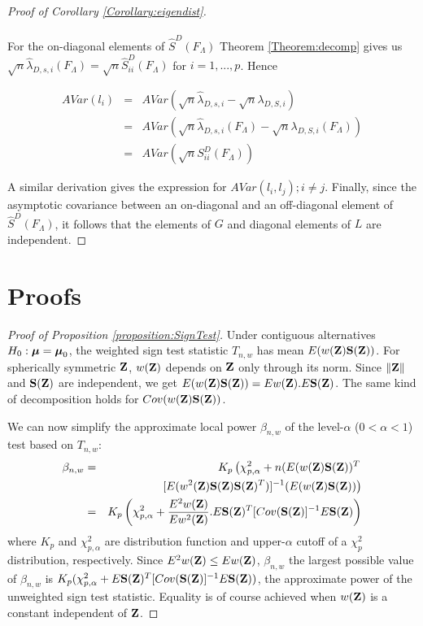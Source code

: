 \documentclass[fleqn,11pt]{article}
\begin{document}
\begin{proof}[Proof of Corollary \ref{Corollary:eigendist}]
\paragraph{}For the on-diagonal elements of $\hat S^D(F_\Lambda)$ Theorem \ref{Theorem:decomp} gives us $ \sqrt n \hat\lambda_{D,s,i} (F_\Lambda) = \sqrt n \hat S^D_{ii}(F_\Lambda)$ for $i = 1,...,p$. Hence

\begin{eqnarray*}
AVar(l_i) &=& AVar(\sqrt n \hat\lambda_{D,s,i} - \sqrt n \lambda_{D,S,i})\\
&=& AVar(\sqrt n \hat\lambda_{D,s,i} (F_\Lambda) - \sqrt n \lambda_{D,S,i}(F_\Lambda))\\
&=& AVar(\sqrt n S^D_{ii}(F_\Lambda))
\end{eqnarray*}

A similar derivation gives the expression for $AVar(l_i,l_j); i \neq j$. Finally, since the asymptotic covariance between an on-diagonal and an off-diagonal element of $\hat S^D(F_\Lambda)$, it follows that the elements of $G$ and diagonal elements of $L$ are independent.
\end{proof}

\section{Proofs}\label{section:appC}

\begin{proof}[Proof of Proposition \ref{proposition:SignTest}]
Under contiguous alternatives $H_0: {\boldsymbol{\mu}} = {\boldsymbol{\mu}}_0$, the weighted sign test statistic $T_{n,w}$ has mean $E (w({\mathbf{Z}}) {\mathbf{S}} ({\mathbf{Z}}))$. For spherically symmetric ${\mathbf{Z}}$, $w({\mathbf{Z}})$ depends on ${\mathbf{Z}}$ only through its norm. Since $\| {\mathbf{Z}} \|$ and ${\mathbf{S}}({\mathbf{Z}})$ are independent, we get $E (w({\mathbf{Z}}) {\mathbf{S}} ({\mathbf{Z}})) = E w({\mathbf{Z}}). E {\mathbf{S}} ({\mathbf{Z}})$. The same kind of decomposition holds for $Cov(w({\mathbf{Z}}) {\mathbf{S}}({\mathbf{Z}}))$.

We can now simplify the approximate local power $\beta_{n,w}$ of the level-$\alpha$ ($0 < \alpha < 1$) test based on $T_{n,w}$:
%
\begin{eqnarray*}
\beta_{n,w} &=& K_p \left( \chi^2_{p,\alpha} + n (E (w({\mathbf{Z}}) {\mathbf{S}} ({\mathbf{Z}}))^T \right.\\
&& \left. [ E (w^2({\mathbf{Z}}) {\mathbf{S}} ({\mathbf{Z}}) {\mathbf{S}} ({\mathbf{Z}})^T) ]^{-1} (E (w({\mathbf{Z}}) {\mathbf{S}} ({\mathbf{Z}})) \right)\\
&=& K_p \left( \chi^2_{p,\alpha} + \frac{E^2 w({\mathbf{Z}})}{Ew^2({\mathbf{Z}})}. E{\mathbf{S}}({\mathbf{Z}})^T [Cov({\mathbf{S}}({\mathbf{Z}})]^{-1} E{\mathbf{S}}({\mathbf{Z}}) \right)
\end{eqnarray*}
%
where $K_p$ and $\chi^2_{p,\alpha}$ are distribution function and upper-$\alpha$ cutoff of a $\chi^2_p$ distribution, respectively. Since $E^2 w({\mathbf{Z}}) \leq Ew({\mathbf{Z}})$, $\beta_{n,w}$ the largest possible value of $\beta_{n,w}$ is $K_p ( \chi^2_{p,\alpha} + E{\mathbf{S}}({\mathbf{Z}})^T [Cov({\mathbf{S}}({\mathbf{Z}})]^{-1} E{\mathbf{S}}({\mathbf{Z}}) )$, the approximate power of the unweighted sign test statistic. Equality is of course achieved when $w({\mathbf{Z}})$ is a constant independent of ${\mathbf{Z}}$.
\end{proof}
\end{document}
